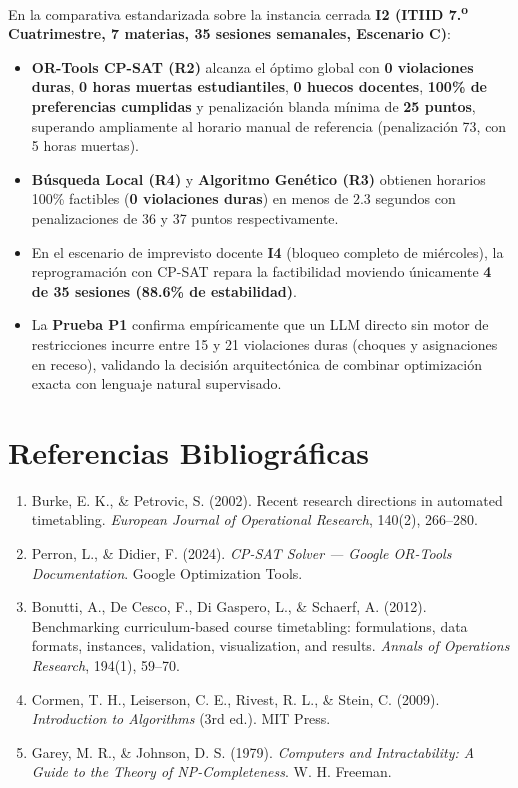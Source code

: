 \documentclass[11pt,letterpaper]{article}
\newcommand{\seccionUPV}[1]{%
    \section{\texorpdfstring{\textcolor{upvmorado}{#1}}{#1}}%
    \vspace{-0.22cm}{\color{upvnaranja}\rule{\textwidth}{1.1pt}}\vspace{0.12cm}%
}
\begin{document}
En la comparativa estandarizada sobre la instancia cerrada \textbf{I2 (ITIID 7.\textsuperscript{o} Cuatrimestre, 7 materias, 35 sesiones semanales, Escenario C)}:
\begin{itemize}
    \item \textbf{OR-Tools CP-SAT (R2)} alcanza el óptimo global con \textbf{0 violaciones duras}, \textbf{0 horas muertas estudiantiles}, \textbf{0 huecos docentes}, \textbf{100\% de preferencias cumplidas} y penalización blanda mínima de \textbf{25 puntos}, superando ampliamente al horario manual de referencia (penalización 73, con 5 horas muertas).
    \item \textbf{Búsqueda Local (R4)} y \textbf{Algoritmo Genético (R3)} obtienen horarios 100\% factibles (\textbf{0 violaciones duras}) en menos de $2.3$ segundos con penalizaciones de 36 y 37 puntos respectivamente.
    \item En el escenario de imprevisto docente \textbf{I4} (bloqueo completo de miércoles), la reprogramación con CP-SAT repara la factibilidad moviendo únicamente \textbf{4 de 35 sesiones (88.6\% de estabilidad)}.
    \item La \textbf{Prueba P1} confirma empíricamente que un LLM directo sin motor de restricciones incurre entre 15 y 21 violaciones duras (choques y asignaciones en receso), validando la decisión arquitectónica de combinar optimización exacta con lenguaje natural supervisado.
\end{itemize}

\seccionUPV{Referencias Bibliográficas}
\begin{enumerate}
    \item Burke, E. K., \& Petrovic, S. (2002). Recent research directions in automated timetabling. \textit{European Journal of Operational Research}, 140(2), 266--280.
    \item Perron, L., \& Didier, F. (2024). \textit{CP-SAT Solver --- Google OR-Tools Documentation}. Google Optimization Tools.
    \item Bonutti, A., De Cesco, F., Di Gaspero, L., \& Schaerf, A. (2012). Benchmarking curriculum-based course timetabling: formulations, data formats, instances, validation, visualization, and results. \textit{Annals of Operations Research}, 194(1), 59--70.
    \item Cormen, T. H., Leiserson, C. E., Rivest, R. L., \& Stein, C. (2009). \textit{Introduction to Algorithms} (3rd ed.). MIT Press.
    \item Garey, M. R., \& Johnson, D. S. (1979). \textit{Computers and Intractability: A Guide to the Theory of NP-Completeness}. W. H. Freeman.
\end{enumerate}
\end{document}
